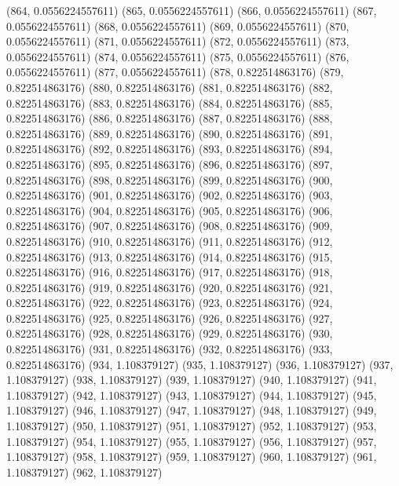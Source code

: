 {					(864, 0.0556224557611)
					(865, 0.0556224557611)
					(866, 0.0556224557611)
					(867, 0.0556224557611)
					(868, 0.0556224557611)
					(869, 0.0556224557611)
					(870, 0.0556224557611)
					(871, 0.0556224557611)
					(872, 0.0556224557611)
					(873, 0.0556224557611)
					(874, 0.0556224557611)
					(875, 0.0556224557611)
					(876, 0.0556224557611)
					(877, 0.0556224557611)
					(878, 0.822514863176)
					(879, 0.822514863176)
					(880, 0.822514863176)
					(881, 0.822514863176)
					(882, 0.822514863176)
					(883, 0.822514863176)
					(884, 0.822514863176)
					(885, 0.822514863176)
					(886, 0.822514863176)
					(887, 0.822514863176)
					(888, 0.822514863176)
					(889, 0.822514863176)
					(890, 0.822514863176)
					(891, 0.822514863176)
					(892, 0.822514863176)
					(893, 0.822514863176)
					(894, 0.822514863176)
					(895, 0.822514863176)
					(896, 0.822514863176)
					(897, 0.822514863176)
					(898, 0.822514863176)
					(899, 0.822514863176)
					(900, 0.822514863176)
					(901, 0.822514863176)
					(902, 0.822514863176)
					(903, 0.822514863176)
					(904, 0.822514863176)
					(905, 0.822514863176)
					(906, 0.822514863176)
					(907, 0.822514863176)
					(908, 0.822514863176)
					(909, 0.822514863176)
					(910, 0.822514863176)
					(911, 0.822514863176)
					(912, 0.822514863176)
					(913, 0.822514863176)
					(914, 0.822514863176)
					(915, 0.822514863176)
					(916, 0.822514863176)
					(917, 0.822514863176)
					(918, 0.822514863176)
					(919, 0.822514863176)
					(920, 0.822514863176)
					(921, 0.822514863176)
					(922, 0.822514863176)
					(923, 0.822514863176)
					(924, 0.822514863176)
					(925, 0.822514863176)
					(926, 0.822514863176)
					(927, 0.822514863176)
					(928, 0.822514863176)
					(929, 0.822514863176)
					(930, 0.822514863176)
					(931, 0.822514863176)
					(932, 0.822514863176)
					(933, 0.822514863176)
					(934, 1.108379127)
					(935, 1.108379127)
					(936, 1.108379127)
					(937, 1.108379127)
					(938, 1.108379127)
					(939, 1.108379127)
					(940, 1.108379127)
					(941, 1.108379127)
					(942, 1.108379127)
					(943, 1.108379127)
					(944, 1.108379127)
					(945, 1.108379127)
					(946, 1.108379127)
					(947, 1.108379127)
					(948, 1.108379127)
					(949, 1.108379127)
					(950, 1.108379127)
					(951, 1.108379127)
					(952, 1.108379127)
					(953, 1.108379127)
					(954, 1.108379127)
					(955, 1.108379127)
					(956, 1.108379127)
					(957, 1.108379127)
					(958, 1.108379127)
					(959, 1.108379127)
					(960, 1.108379127)
					(961, 1.108379127)
					(962, 1.108379127)
}
